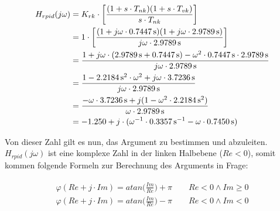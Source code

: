 \begin{gather} \label{eq:app:h_rpid:start}
    \begin{split}
        H_{rpid}(j\omega)
                 & = K_{rk} \cdot \biggl[ \frac{(1 + s       \cdot T_{nk}              ) (1 + s       \cdot T_{vk}              )}{ s       \cdot T_{nk} }              \biggr] \\
                 & =      1 \cdot \biggl[ \frac{(1 + j\omega \cdot \SI{0.7447}{\second}) (1 + j\omega \cdot \SI{2.9789}{\second})}{ j\omega \cdot \SI{2.9789}{\second}} \biggr] \\
                 & = \frac{%
                                1
                                +
                                j\omega
                                \cdot (
                                          \SI{2.9789}{\second}
                                          +
                                          \SI{0.7447}{\second}
                                      )
                                -
                                \omega^2
                                \cdot
                                \SI{0.7447}{\second}
                                \cdot
                                \SI{2.9789}{\second}
                           }{%
                                j\omega
                                \cdot
                                \SI{2.9789}{\second}
                           } \\
                 & = \frac{1 - \SI{2.2184}{\square\second} \cdot \omega^2 + j\omega \cdot \SI{3.7236}{\second}}{j\omega \cdot \SI{2.9789}{\second}} \\
                 & = \frac{-\omega \cdot \SI{3.7236}{\second} + j (1 - \omega^2 \cdot \SI{2.2184}{\square\second})}{\omega \cdot \SI{2.9789}{\second}} \\
                 & = -1.250 + j \cdot (\omega^{-1} \cdot \SI{0.3357}{\per\second} - \omega \cdot \SI{0.7450}{\second})
    \end{split}
\end{gather}

Von   dieser   Zahl   gilt   es   nun,   das   Argument   zu   bestimmen   und
abzuleiten. $H_{rpid}(j\omega)$ ist eine komplexe Zahl in der linken Halbebene
($Re <  0$), somit  kommen folgende  Formeln zur  Berechnung des  Arguments in
Frage:

\begin{gather} \label{eq:app:argument}
    \begin{split}
        \varphi(Re + j \cdot Im) = atan \biggl( \frac{Im}{Re} \biggr) + \pi \hspace{2em} Re < 0 \land Im \geq 0 \\
        \varphi(Re + j \cdot Im) = atan \biggl( \frac{Im}{Re} \biggr) - \pi \hspace{2em} Re < 0 \land Im < 0
    \end{split}
\end{gather}

